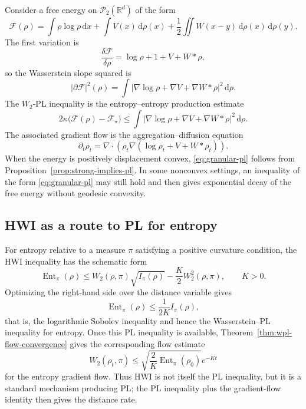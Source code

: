 \documentclass[11pt]{article}
\theoremstyle{definition}
\DeclareMathOperator{\Ent}{Ent}
\newcommand{\Ptwo}{\mathcal P_2}
\newcommand{\F}{\mathcal F}
\newcommand{\W}{W_2}
\newcommand{\R}{\mathbb R}
\newcommand{\dd}{\,\mathrm d}
\begin{document}
Consider a free energy on $\Ptwo(\R^d)$ of the form
\begin{equation}
        \F(\rho)
        =\int \rho\log\rho\dd x
         +\int V(x)\dd\rho(x)
         +\frac12\iint W(x-y)\dd\rho(x)\dd\rho(y).
        \label{eq:granular-free-energy}
\end{equation}
The first variation is
\[
        \frac{\delta\F}{\delta\rho}
        =\log\rho+1+V+W*\rho,
\]
so the Wasserstein slope squared is
\begin{equation}
        |\partial\F|^2(\rho)
        =\int \left|\nabla\log\rho+\nabla V+\nabla W*\rho\right|^2\dd\rho.
        \label{eq:granular-dissipation}
\end{equation}
The $\W$-PL inequality is the entropy--entropy production estimate
\begin{equation}
        2\kappa\bigl(\F(\rho)-\F_\star\bigr)
        \le
        \int \left|\nabla\log\rho+\nabla V+\nabla W*\rho\right|^2\dd\rho.
        \label{eq:granular-pl}
\end{equation}
The associated gradient flow is the aggregation--diffusion equation
\begin{equation}
        \partial_t\rho_t
        =\nabla\cdot\left(\rho_t\nabla(\log\rho_t+V+W*\rho_t)\right).
        \label{eq:aggregation-diffusion}
\end{equation}
When the energy is positively displacement convex, \eqref{eq:granular-pl} follows from Proposition~\ref{prop:strong-implies-pl}. In some nonconvex settings, an inequality of the form \eqref{eq:granular-pl} may still hold and then gives exponential decay of the free energy without geodesic convexity.

\subsection{HWI as a route to PL for entropy}

For entropy relative to a measure $\pi$ satisfying a positive curvature condition, the HWI inequality has the schematic form
\begin{equation}
        \Ent_\pi(\rho)
        \le
        \W(\rho,\pi)\sqrt{I_\pi(\rho)}
        -\frac{K}{2}\W^2(\rho,\pi),
        \qquad K>0.
        \label{eq:hwi}
\end{equation}
Optimizing the right-hand side over the distance variable gives
\begin{equation}
        \Ent_\pi(\rho)\le \frac{1}{2K}I_\pi(\rho),
        \label{eq:hwi-to-lsi}
\end{equation}
that is, the logarithmic Sobolev inequality and hence the Wasserstein--PL inequality for entropy. Once this PL inequality is available, Theorem~\ref{thm:wpl-flow-convergence} gives the corresponding flow estimate
\[
        \W(\rho_t,\pi)
        \le \sqrt{\frac{2}{K}\Ent_\pi(\rho_0)}e^{-Kt}
\]
for the entropy gradient flow. Thus HWI is not itself the PL inequality, but it is a standard mechanism producing PL; the PL inequality plus the gradient-flow identity then gives the distance rate.
\end{document}
